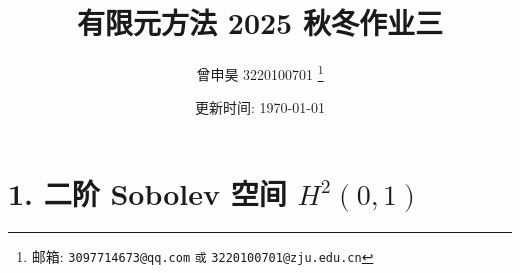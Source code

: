 \documentclass[a4paper]{article}
\begin{document}
\title{有限元方法 2025 秋冬作业三}

\author{曾申昊 3220100701
  \thanks{邮箱: \texttt{3097714673@qq.com}
                            \texttt{或} \texttt{3220100701@zju.edu.cn}}}


\date{更新时间: \today}

\maketitle


\section*{1. 二阶 Sobolev 空间 $H^2(0,1)$}
\end{document}
